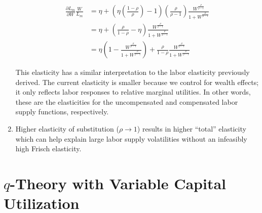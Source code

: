 \documentclass[11pt]{article}
\begin{document}
\begin{enumerate}
        	\begin{align*}
        	\frac{\partial L_m}{\partial W} \frac{W}{L_m} &= \eta + \left( \eta \left( \frac{1-\rho}{\rho} \right) -1  \right) \left( \frac{\rho}{\rho-1} \right) \frac{W^{\frac{\rho}{\rho-1}}}{1 + W^{\frac{\rho}{\rho-1}}} \\
        	& = \eta + \left(  \frac{\rho}{1-\rho} - \eta \right) \frac{W^{\frac{\rho}{\rho-1}}}{1 + W^{\frac{\rho}{\rho-1}}} \\
            & = \eta \left ( 1 - \frac{W^{\frac{\rho}{\rho-1}}}{1 + W^{\frac{\rho}{\rho-1}}} \right ) + \frac{\rho}{1-\rho} \frac{W^{\frac{\rho}{\rho-1}}}{1 + W^{\frac{\rho}{\rho-1}}}
        	\end{align*}

        This elasticity has a similar interpretation to the labor elasticity previously derived. The current elasticity is smaller because we control for wealth effects; it only reflects labor responses to relative marginal utilities. In other words, these are the elasticities for the uncompensated and compensated labor supply functions, respectively.

        \item Higher elasticity of substitution ($\rho \to 1$) results in higher ``total'' elasticity which can help explain large labor supply volatilities without an infeasibly high Frisch elasticity.

    \end{enumerate}

\section{$q$-Theory with Variable Capital Utilization}
\end{document}
